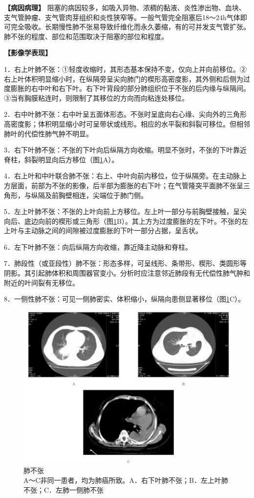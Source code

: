 \textbf{【病因病理】}
阻塞的病因较多，如吸入异物、浓稠的黏液、炎性渗出物、血块、支气管肿瘤、支气管肉芽组织和炎性狭窄等。一般气管完全阻塞后18～24h气体即可完全吸收。长期慢性肺不张易导致纤维化而永久萎缩，有的可并发支气管扩张。肺不张的程度、部位和范围取决于阻塞的部位和程度。

\textbf{【影像学表现】}

1．右上叶肺不张：①轻度收缩时，其形态基本保持不变，仅向上并向前移位。②右上叶体积明显缩小时，在纵隔旁呈尖向肺门的楔形高密度影，其外侧和后侧为过度膨胀的右中叶和右下叶。右下叶背段的部分肺组织位于不张的后内缘与纵隔间。③当有胸膜粘连时，则限制了其移位的方向而向粘连处移位。

2．右中叶肺不张：右中叶呈五面体形态。不张时呈底向右心缘、尖向外的三角形高密度影；体积明显缩小时可呈带状或线形。相应的水平裂和斜裂可移位。但相邻肺叶的代偿性肺气肿不明显。

3．右下叶肺不张：不张的下叶向后纵隔方向收缩。明显不张时，不张的下叶靠近脊柱，斜裂明显向后方移位（图\ref{fig9-9}A）。

4．右上叶和中叶联合肺不张：右上、中叶向前内移位，位于纵隔旁。在主动脉上方层面，前部为不张的影像，后半部为膨胀的右下叶；在气管隆突平面肺不张呈三角形，与纵隔及前胸壁相连，尖端位于肺门侧。

5．左上叶肺不张：不张的上叶向前上方移位。左上叶一部分与前胸壁接触，呈尖向后、底边向前的楔形或三角形（图\ref{fig9-9}B）。其上方为过度膨胀的左下叶。不张的左上叶与主动脉之间的间隙被过度膨胀的下叶一部分占据，呈舌状。

6．左下叶肺不张：向后纵隔方向收缩，靠近降主动脉和脊柱。

7．肺段性（或亚段性）肺不张：形态多样，可呈线形、条带形、楔形、类圆形等阴影。其引起肺体积和周围器官变小。分析时应注意邻近肺段有无代偿性肺气肿和附近的叶间裂有无移位。

8．一侧性肺不张：可见一侧肺密实、体积缩小，纵隔向患侧显著移位（图\ref{fig9-9}C）。

\begin{figure}[!htbp]
 \centering
 \includegraphics[width=.7\textwidth,height=\textheight,keepaspectratio]{./images/Image00193.jpg}
 \captionsetup{justification=centering}
 \caption{肺不张\\{\small A～C非同一患者，均为肺癌所致。A．右下叶肺不张；B．左上叶肺不张；C．左肺一侧肺不张}}
 \label{fig9-9}
  \end{figure} 

